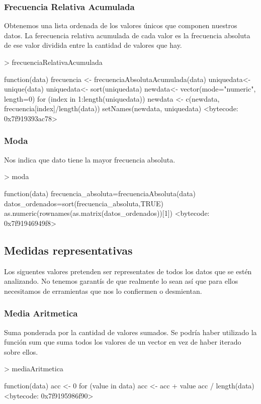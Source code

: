 \documentclass [a4paper] {article}
\begin{document}
\subsubsection{Frecuencia Relativa Acumulada}
Obtenemos una lista ordenada de los valores únicos que componen nuestros datos.
La ferecuencia relativa acumulada de cada valor es la frecuencia absoluta de ese valor dividida entre la cantidad de valores que hay.
\begin{Schunk}
\begin{Sinput}
> frecuenciaRelativaAcumulada
\end{Sinput}
\begin{Soutput}
function(data){
  frecuencia <- frecuenciaAbsolutaAcumulada(data)
  uniquedata<-unique(data)
  uniquedata<- sort(uniquedata)
  newdata<- vector(mode="numeric", length=0)
  for (index in 1:length(uniquedata)) {
    newdata <- c(newdata, frecuencia[index]/length(data))
  }
  setNames(newdata, uniquedata)
}
<bytecode: 0x7f919393ac78>
\end{Soutput}
\end{Schunk}
\subsubsection{Moda}
Nos indica que dato tiene la mayor frecuencia absoluta.
\begin{Schunk}
\begin{Sinput}
> moda
\end{Sinput}
\begin{Soutput}
function(data) {
  frecuencia_absoluta=frecuenciaAbsoluta(data)
  datos_ordenados=sort(frecuencia_absoluta,TRUE)
  as.numeric(rownames(as.matrix(datos_ordenados))[1])
}
<bytecode: 0x7f91946949f8>
\end{Soutput}
\end{Schunk}

\newpage
\subsection{Medidas representativas}
Los siguentes valores pretenden ser representates de todos los datos que se estén analizando.
No tenemos garantís de que realmente lo sean así que para ellos necesitamos de erramientas que nos lo confiermen o desmientan.
\subsubsection{Media Aritmetica}
Suma ponderada por la cantidad de valores sumados.
Se podría haber utilizado la función sum que suma todos los valores de un vector en vez de haber iterado sobre ellos.
\begin{Schunk}
\begin{Sinput}
> mediaAritmetica
\end{Sinput}
\begin{Soutput}
function(data){
  acc <- 0
  for (value in data) {
    acc <- acc + value
  }
  acc / length(data)
}
<bytecode: 0x7f9195986f90>
\end{Soutput}
\end{Schunk}
\end{document}
